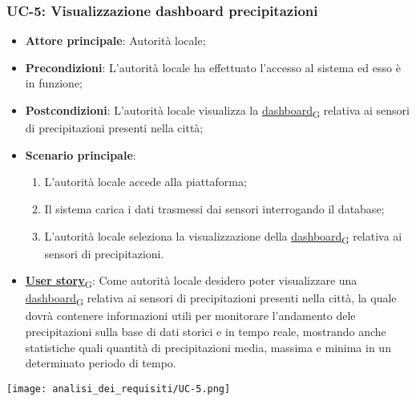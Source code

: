\subsubsection{UC-5: Visualizzazione dashboard precipitazioni}
\begin{itemize}
	\item \textbf{Attore principale}: Autorità locale;
	\item \textbf{Precondizioni}: L'autorità locale ha effettuato l'accesso al sistema ed esso è in funzione;
	\item \textbf{Postcondizioni}: L'autorità locale visualizza la \href{https://7last.github.io/docs/rtb/documentazione-interna/glossario\#dashboard}{dashboard\textsubscript{G}} relativa
	      ai sensori di precipitazioni presenti nella città;
	\item \textbf{Scenario principale}:
	      \begin{enumerate}
		      \item L'autorità locale accede alla piattaforma;
		      \item Il sistema carica i dati trasmessi dai sensori interrogando il database;
		      \item L'autorità locale seleziona la visualizzazione della \href{https://7last.github.io/docs/rtb/documentazione-interna/glossario\#dashboard}{dashboard\textsubscript{G}} relativa ai sensori di precipitazioni.
	      \end{enumerate}
	\item \href{https://7last.github.io/docs/rtb/documentazione-interna/glossario\#user-story}{\textbf{User story}\textsubscript{G}}:
	      Come autorità locale desidero poter visualizzare una \href{https://7last.github.io/docs/rtb/documentazione-interna/glossario\#dashboard}{dashboard\textsubscript{G}} relativa ai sensori di precipitazioni presenti nella città, la quale
	      dovrà contenere informazioni utili per monitorare l'andamento dele precipitazioni sulla base di dati storici e in tempo reale, mostrando
	      anche statistiche quali quantità di precipitazioni media, massima e minima in un determinato periodo di tempo.
\end{itemize}
\begin{center}
	\texttt{[image: analisi\_dei\_requisiti/UC-5.png]}
\end{center}

